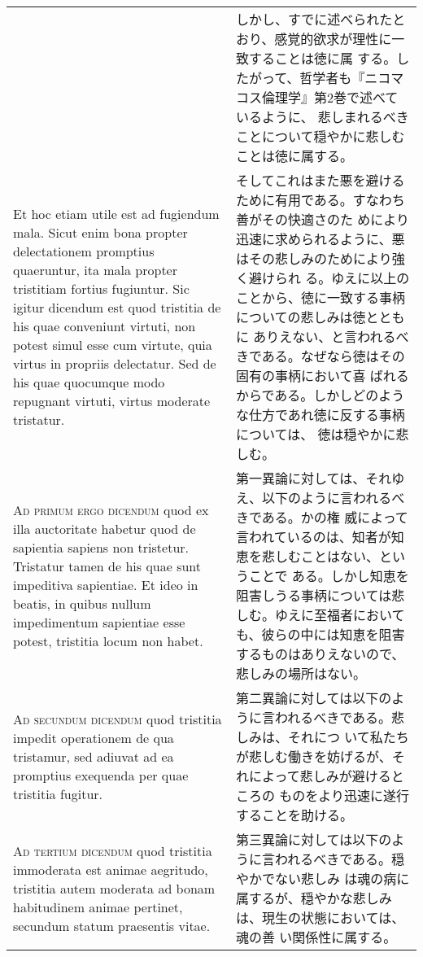 \documentclass[10pt]{jsarticle}
\begin{document}
\begin{longtable}{p{21em}p{21em}}
&

しかし、すでに述べられたとおり、感覚的欲求が理性に一致することは徳に属
する。したがって、哲学者も『ニコマコス倫理学』第2巻で述べているように、
悲しまれるべきことについて穏やかに悲しむことは徳に属する。
 

\\

 Et hoc etiam utile est ad fugiendum mala. Sicut
 enim bona propter delectationem promptius quaeruntur, ita mala
 propter tristitiam fortius fugiuntur. Sic igitur dicendum est quod
 tristitia de his quae conveniunt virtuti, non potest simul esse cum
 virtute, quia virtus in propriis delectatur. Sed de his quae
 quocumque modo repugnant virtuti, virtus moderate tristatur.

&

そしてこれはまた悪を避けるために有用である。すなわち善がその快適さのた
めにより迅速に求められるように、悪はその悲しみのためにより強く避けられ
る。ゆえに以上のことから、徳に一致する事柄についての悲しみは徳とともに
ありえない、と言われるべきである。なぜなら徳はその固有の事柄において喜
ばれるからである。しかしどのような仕方であれ徳に反する事柄については、
徳は穏やかに悲しむ。
 

\\



{\scshape Ad primum ergo dicendum} quod ex illa auctoritate habetur
quod de sapientia sapiens non tristetur. Tristatur tamen de his quae
sunt impeditiva sapientiae. Et ideo in beatis, in quibus nullum
impedimentum sapientiae esse potest, tristitia locum non habet.


&

 第一異論に対しては、それゆえ、以下のように言われるべきである。かの権
威によって言われているのは、知者が知恵を悲しむことはない、ということで
ある。しかし知恵を阻害しうる事柄については悲しむ。ゆえに至福者において
も、彼らの中には知恵を阻害するものはありえないので、悲しみの場所はない。

\\



{\scshape Ad secundum dicendum} quod tristitia impedit operationem de
qua tristamur, sed adiuvat ad ea promptius exequenda per quae
tristitia fugitur.

&

 第二異論に対しては以下のように言われるべきである。悲しみは、それにつ
 いて私たちが悲しむ働きを妨げるが、それによって悲しみが避けるところの
 ものをより迅速に遂行することを助ける。

\\


{\scshape Ad tertium dicendum} quod tristitia immoderata est animae
aegritudo, tristitia autem moderata ad bonam habitudinem animae
pertinet, secundum statum praesentis vitae.

&

 第三異論に対しては以下のように言われるべきである。穏やかでない悲しみ
 は魂の病に属するが、穏やかな悲しみは、現生の状態においては、魂の善
 い関係性に属する。


\end{longtable}
\newpage
\end{document}
